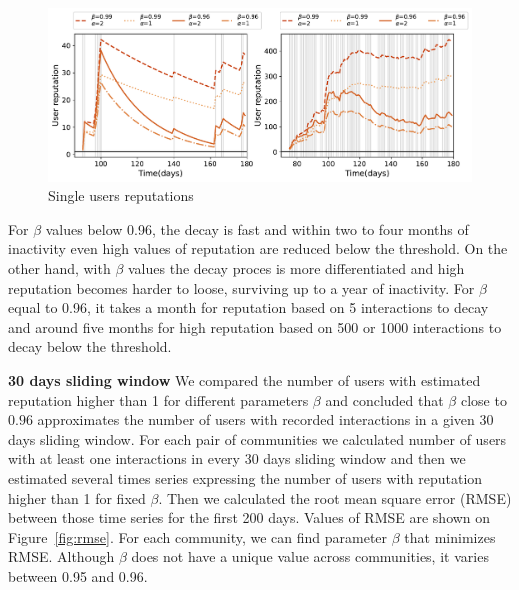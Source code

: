 
\begin{figure}[h!]
	\centering
	\includegraphics[width=0.8\linewidth]{figures/stackexchange/single_user_reputation.pdf}
	\caption{Single users reputations }
	\label{fig:singleuser}
\end{figure}

For $\beta$ values below 0.96, the decay is fast and within two to four months of inactivity even high values of reputation are reduced below the threshold. On the other hand, with $\beta$ values the decay proces is more differentiated and high reputation becomes harder to loose, surviving up to a year of inactivity. For $\beta$ equal to 0.96, it takes a month for reputation based on 5 interactions to decay and around five months for high reputation based on 500 or 1000 interactions to decay below the threshold.

\textbf{30 days sliding window} We compared the number of users with estimated reputation higher than 1 for different parameters $\beta$ and concluded that $\beta$ close to $0.96$ approximates the number of users with recorded interactions in a given 30 days sliding window. For each pair of communities we calculated number of users with at least one interactions in every 30 days sliding window and then we estimated several times series expressing the number of users with reputation higher than 1 for fixed $\beta$. Then we calculated the root mean square error (RMSE) between those time series for the first 200 days. Values of RMSE are shown on Figure~\ref{fig:rmse}. For each community, we can find parameter $\beta$ that minimizes RMSE. Although $\beta$ does not have a unique value across communities, it varies between 0.95 and 0.96. 


